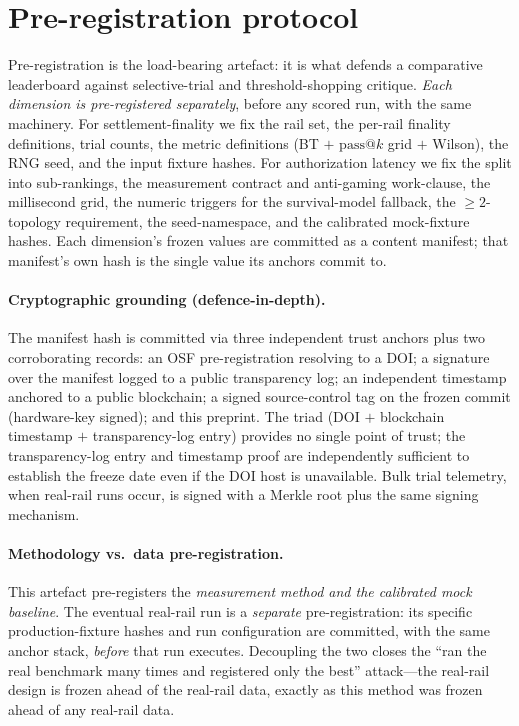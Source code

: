 \documentclass[11pt]{article}
\begin{document}
\section{Pre-registration protocol}
Pre-registration is the load-bearing artefact: it is what defends a comparative leaderboard against
selective-trial and threshold-shopping critique. \emph{Each dimension is pre-registered separately},
before any scored run, with the same machinery. For settlement-finality we fix the rail set, the
per-rail finality definitions, trial counts, the metric definitions (BT $+$ $\mathrm{pass}@k$ grid $+$
Wilson), the RNG seed, and the input fixture hashes. For authorization latency we fix the split into
sub-rankings, the measurement contract and anti-gaming work-clause, the millisecond grid, the numeric
triggers for the survival-model fallback, the $\ge 2$-topology requirement, the seed-namespace, and the
calibrated mock-fixture hashes. Each dimension's frozen values are committed as a content manifest;
that manifest's own hash is the single value its anchors commit to.

\paragraph{Cryptographic grounding (defence-in-depth).} The manifest hash is committed via three
independent trust anchors plus two corroborating records: an OSF pre-registration resolving to a DOI;
a signature over the manifest logged to a public transparency log; an independent timestamp anchored to
a public blockchain; a signed source-control tag on the frozen commit (hardware-key signed); and this
preprint. The triad (DOI $+$ blockchain timestamp $+$ transparency-log entry) provides no single point
of trust; the transparency-log entry and timestamp proof are independently sufficient to establish the
freeze date even if the DOI host is unavailable. Bulk trial telemetry, when real-rail runs occur, is
signed with a Merkle root plus the same signing mechanism.

\paragraph{Methodology vs.\ data pre-registration.} This artefact pre-registers the \emph{measurement
method and the calibrated mock baseline}. The eventual real-rail run is a \emph{separate}
pre-registration: its specific production-fixture hashes and run configuration are committed, with the
same anchor stack, \emph{before} that run executes. Decoupling the two closes the ``ran the real
benchmark many times and registered only the best'' attack---the real-rail design is frozen ahead of
the real-rail data, exactly as this method was frozen ahead of any real-rail data.
\end{document}
